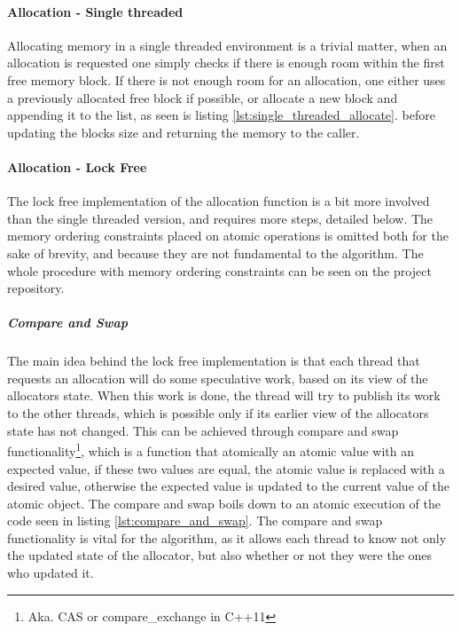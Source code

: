\paragraph{Allocation - Single threaded}
Allocating memory in a single threaded environment is a trivial matter,
when an allocation is requested one simply checks if there is enough room within the first free memory block.
If there is not enough room for an allocation, one either uses a previously allocated free block if possible,
or allocate a new block and appending it to the list, as seen is listing \ref{lst:single_threaded_allocate}.
before updating the blocks size and returning the memory to the caller.


\paragraph{Allocation - Lock Free}
The lock free implementation of the allocation function is a bit more involved than the single threaded version,
and requires more steps, detailed below. The memory ordering constraints placed on atomic operations is omitted both for the sake of brevity,
and because they are not fundamental to the algorithm. The whole procedure with memory ordering constraints can be seen on the project repository.

\subparagraph{Compare and Swap}
The main idea behind the lock free implementation is that each thread that requests an allocation will do some
speculative work, based on its view of the allocators state. When this work is done, the thread will try to publish
its work to the other threads, which is possible only if its earlier view of the allocators state has not changed.
This can be achieved through compare and swap functionality\footnote{Aka. CAS or compare\_exchange in C++11},
which is a function that atomically an atomic value with an expected value, if these two values are equal,
the atomic value is replaced with a desired value, otherwise the expected value is updated to the current value
of the atomic object. The compare and swap boils down to an atomic execution of the code seen in listing \ref{lst:compare_and_swap}.
The compare and swap functionality is vital for the algorithm, as it allows each thread to know not only the updated
state of the allocator, but also whether or not they were the ones who updated it.


